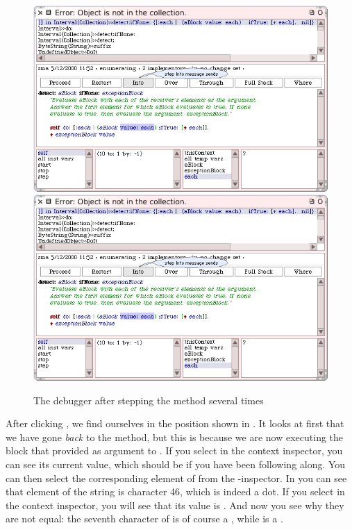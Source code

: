 \documentclass[a4paper,10pt,twoside]{book}
\begin{document}
\begin{figure}[btp]
	\begin{center}
	\ifluluelse
		{\includegraphics[width=\textwidth]{steppingIntoValue}}
		{\includegraphics[scale=0.7]{steppingIntoValue}}
	\end{center}
	\caption{The debugger after stepping  the  method several times}
	\label{fig:steppingIntoValue}
\end{figure}

After clicking , we find ourselves in the position shown in .
It looks at first that we have gone \emph{back} to the  method, but this is because we are now executing the block that  provided as argument to .  
If you select  in the context inspector, you can see its current value, which should be  if you have been following along.  
You can then select the corresponding element of \self from the \self{}-inspector.
In   you can see that element  of the string is character 46, which is indeed a dot.
If you select  in the context inspector, you will see that its value is .
And now you see why they are not equal: the seventh character of  is of course a , while  is a .
\end{document}
